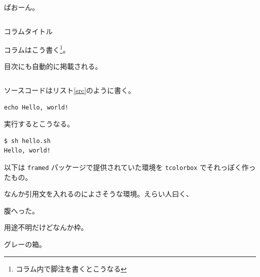 ぱおーん。

\begin{column}{コラムタイトル}

コラムはこう書く\footnote{コラム内で脚注を書くとこうなる}。

目次にも自動的に掲載される。

\end{column}

ソースコードはリスト\ref{src}のように書く。

\begin{lstlisting}[caption=hello.sh, label=src]
echo Hello, world!
\end{lstlisting}

実行するとこうなる。

\begin{lstlisting}[style=tty]
$ sh hello.sh
Hello, world!
\end{lstlisting}


以下は \verb`framed` パッケージで提供されていた環境を \verb`tcolorbox` でそれっぽく作ったもの。

なんか引用文を入れるのによさそうな環境。えらい人曰く、

\begin{leftbar}
腹へった。
\end{leftbar}

用途不明だけどなんか枠。

\begin{snugshade}
グレーの箱。
\end{snugshade}

